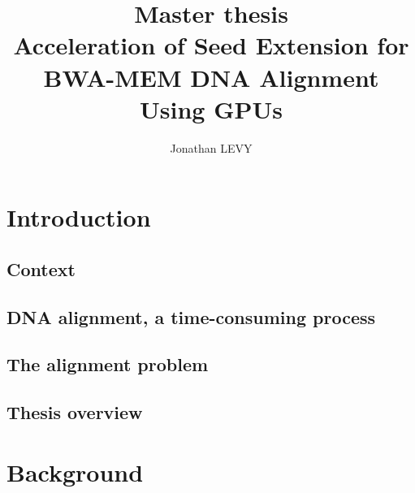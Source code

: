 \documentclass[11pt,twoside]{ce}
\author{Jonathan LEVY}
\title{Master thesis \\Acceleration of Seed Extension for BWA-MEM DNA Alignment Using GPUs}
\begin{document}
	\maketitle
	
	\begin{abstract}
		
	\end{abstract}

	\renewcommand{\abstractname}{Acknowledgements}
	\begin{abstract}
		
	\end{abstract}

	
	\tableofcontents
	
	\chapter{Introduction}
	\label{chap:intro}
	
	
		\section{Context}
		
		
		\section{DNA alignment, a time-consuming process}
		
		
		\section{The alignment problem}
		
	
		\section{Thesis overview}
		
		
	\chapter{Background}
	\label{chap:background}
\end{document}
